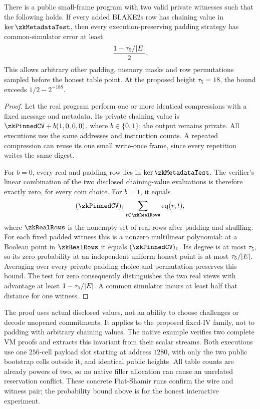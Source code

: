 \begin{theorem}\label{thm:zk-flock-metadata-floor}
There is a public small-frame program with two valid private witnesses such that the following holds. If every added BLAKE2s row has chaining value in $\ker\zkMetadataTest$, then every execution-preserving padding strategy has common-simulator error at least
\[
 \frac{1-\tau_5/|E|}{2}.
\]
This allows arbitrary other padding, memory masks and row permutations sampled before the honest table point. At the proposed height $\tau_5=18$, the bound exceeds $1/2-2^{-188}$.
\end{theorem}
\begin{proof}
Let the real program perform one or more identical compressions with a fixed message and metadata. Its private chaining value is $\zkPinnedCV+b(1,0,0,0)$, where $b\in\{0,1\}$; the output remains private. All executions use the same addresses and instruction counts. A repeated compression can reuse its one small write-once frame, since every repetition writes the same digest.

For $b=0$, every real and padding row lies in $\ker\zkMetadataTest$. The verifier's linear combination of the two disclosed chaining-value evaluations is therefore exactly zero, for every coin choice. For $b=1$, it equals
\[
 (\zkPinnedCV)_1\sum_{t\in\zkRealRows}\eq(r,t),
\]
where $\zkRealRows$ is the nonempty set of real rows after padding and shuffling. For each fixed padded witness this is a nonzero multilinear polynomial: at a Boolean point in $\zkRealRows$ it equals $(\zkPinnedCV)_1$. Its degree is at most $\tau_5$, so its zero probability at an independent uniform honest point is at most $\tau_5/|E|$. Averaging over every private padding choice and permutation preserves this bound. The test for zero consequently distinguishes the two real views with advantage at least $1-\tau_5/|E|$. A common simulator incurs at least half that distance for one witness.
\end{proof}

The proof uses actual disclosed values, not an ability to choose challenges or decode unopened commitments. It applies to the proposed fixed-IV family, not to padding with arbitrary chaining values. The native example  verifies two complete VM proofs and extracts this invariant from their scalar streams. Both executions use one $256$-cell payload slot starting at address $1280$, with only the two public bootstrap cells outside it, and identical public heights. All table counts are already powers of two, so no native filler allocation can cause an unrelated reservation conflict. These concrete Fiat-Shamir runs confirm the wire and witness pair; the probability bound above is for the honest interactive experiment.

